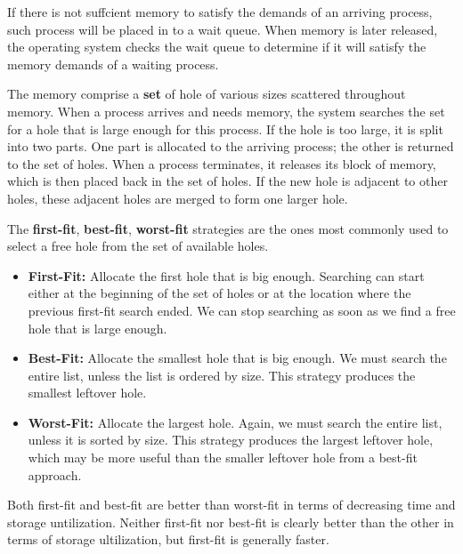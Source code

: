 \documentclass[10pt]{article}
\newcommand{\tf}{\textbf}
\begin{document}
\par{If there is not suffcient memory to satisfy the demands of an arriving process, such process will be placed in to a wait queue. When memory is later released, the operating system checks the wait queue to determine if it will satisfy the memory demands of a waiting process.} \\

\par{The memory comprise a \tf{set} of hole of various sizes scattered throughout memory. When a process arrives and needs memory, the system searches the set for a hole that is large enough for this process. If the hole is too large, it is split into two parts. One part is allocated to the arriving process; the other is returned to the set of holes. When a process terminates, it releases its block of memory, which is then placed back in the set of holes. If the new hole is adjacent to other holes, these adjacent holes are merged to form one larger hole.} \\

\par{The \tf{first-fit}, \tf{best-fit}, \tf{worst-fit} strategies are the ones most commonly used to select a free hole from the set of available holes.} \\

\begin{itemize}
	\item \tf{First-Fit:} Allocate the first hole that is big enough. Searching can start either at the beginning of the set of holes or at the location where the previous first-fit search ended. We can stop searching as soon as we find a free hole that is large enough.
	\item \tf{Best-Fit:} Allocate the smallest hole that is big enough. We must search the entire list, unless the list is ordered by size. This strategy produces the smallest leftover hole.
	\item \tf{Worst-Fit:} Allocate the largest hole. Again, we must search the entire list, unless it is sorted by size. This strategy produces the largest leftover hole, which may be more useful than the smaller leftover hole from a best-fit approach.
\end{itemize}

\par{Both first-fit and best-fit are better than worst-fit in terms of decreasing time and storage untilization. Neither first-fit nor best-fit is clearly better than the other in terms of storage ultilization, but first-fit is generally faster.}
\end{document}
